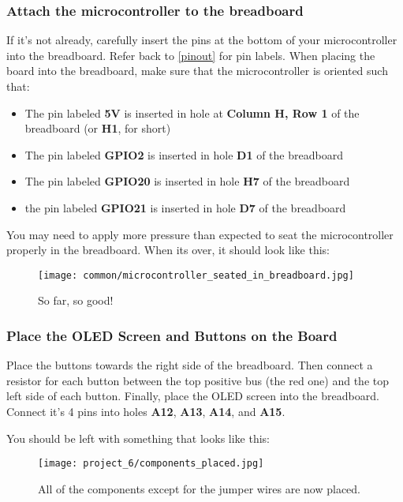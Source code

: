 \subsubsection{Attach the microcontroller to the breadboard}
If it's not already, carefully insert the pins at the bottom of your microcontroller into the breadboard. Refer back
to \ref{pinout} for pin labels. When placing the board into the breadboard, make sure that the microcontroller is oriented such that:
\begin{itemize}
    \item The pin labeled \textbf{5V} is inserted in hole at \textbf{Column H, Row 1} of the breadboard (or \textbf{H1}, for short)
    \item The pin labeled \textbf{GPIO2} is inserted in hole \textbf{D1} of the breadboard
    \item The pin labeled \textbf{GPIO20} is inserted in hole \textbf{H7} of the breadboard
    \item the pin labeled \textbf{GPIO21} is inserted in hole \textbf{D7} of the breadboard
\end{itemize}
You may need to apply more pressure than expected to seat the microcontroller properly in the breadboard. When its over, it should look like this:
\begin{figure}[H]
    \centering
    \texttt{[image: common/microcontroller\_seated\_in\_breadboard.jpg]}
    \caption{So far, so good!}
\end{figure}

\subsubsection{Place the OLED Screen and Buttons on the Board}
Place the buttons towards the right side of the breadboard. Then connect a resistor for each button between the top positive
bus (the red one) and the top left side of each button. Finally, place the OLED screen into the breadboard. Connect
it's 4 pins into holes \textbf{A12}, \textbf{A13}, \textbf{A14}, and \textbf{A15}.

You should be left with something that looks like this:
\begin{figure}[H]
    \centering
    \texttt{[image: project\_6/components\_placed.jpg]}
    \caption{All of the components except for the jumper wires are now placed.}
\end{figure}

